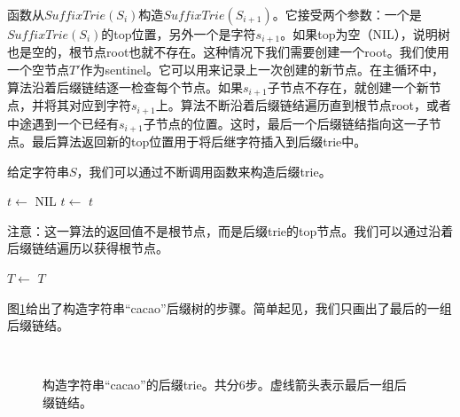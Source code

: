 \documentclass[UTF8]{article}
\begin{document}
函数从$SuffixTrie(S_i)$构造$SuffixTrie(S_{i+1})$。它接受两个参数：一个是$SuffixTrie(S_i)$的top位置，另外一个是字符$s_{i+1}$。如果top为空（NIL），说明树也是空的，根节点root也就不存在。这种情况下我们需要创建一个root。我们使用一个空节点$T'$作为sentinel。它可以用来记录上一次创建的新节点。在主循环中，算法沿着后缀链结逐一检查每个节点。如果$s_{i+1}$子节点不存在，就创建一个新节点，并将其对应到字符$s_{i+1}$上。算法不断沿着后缀链结遍历直到根节点root，或者中途遇到一个已经有$s_{i+1}$子节点的位置。这时，最后一个后缀链结指向这一子节点。最后算法返回新的top位置用于将后继字符插入到后缀trie中。

给定字符串$S$，我们可以通过不断调用函数来构造后缀trie。

\begin{algorithmic}[1]
  \State $t \gets$ NIL
    \State $t \gets$ 
  \EndFor
  \State \Return $t$
\EndFunction
\end{algorithmic}

注意：这一算法的返回值不是根节点，而是后缀trie的top节点。我们可以通过沿着后缀链结遍历以获得根节点。

\begin{algorithmic}[1]
    \State $T \gets$ 
  \EndWhile
  \State \Return $T$
\EndFunction
\end{algorithmic}

图\ref{fig:cons-strie-cacao}给出了构造字符串“cacao”后缀树的步骤。简单起见，我们只画出了最后的一组后缀链结。

\begin{figure}[htbp]
  \centering
   \\
  \caption{构造字符串“cacao”的后缀trie。共分6步。虚线箭头表示最后一组后缀链结。}
  \label{fig:cons-strie-cacao}
\end{figure}
\end{document}
